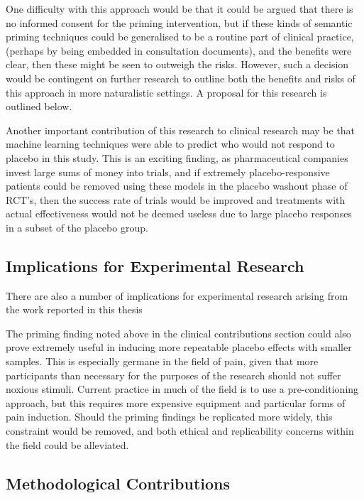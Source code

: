 One difficulty with this approach would be that it could be argued that there is no informed consent for the priming intervention, but if these kinds of semantic priming techniques could be generalised to be a routine part of clinical practice, (perhaps by being embedded in consultation documents), and the benefits were clear, then these might be seen to outweigh the risks. However, such a decision would be contingent on further research to outline both the benefits and risks of this approach in more naturalistic settings. A proposal for this research is outlined below.

Another important contribution of this research to clinical research may be that machine learning techniques were able to predict who would not respond to placebo in this study. This is an exciting finding, as pharmaceutical companies invest large sums of money into trials, and if extremely placebo-responsive patients could be removed using these models in the placebo washout phase of RCT's, then the success rate of trials would be improved and treatments with actual effectiveness would not be deemed useless due to large placebo responses in a subset of the placebo group. 

\subsection{Implications for Experimental Research}
\label{sec:impl-exper-rese}

There are also a number of implications for experimental research arising from the work reported in this thesis

The priming finding noted above in the clinical contributions section could also prove extremely useful in inducing more repeatable placebo effects with smaller samples. This is especially germane in the field of pain, given that more participants than necessary for the purposes of the research should not suffer noxious stimuli. Current practice in much of the field is to use a pre-conditioning approach, but this requires more expensive equipment and particular forms of pain induction. Should the priming findings be replicated more widely, this constraint would be removed, and both ethical and replicability concerns within the field could be alleviated. 



\subsection{Methodological Contributions}
\label{sec:meth-contr}

